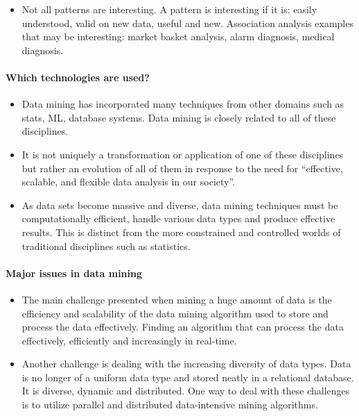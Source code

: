 \documentclass[11pt]{article}
\providecommand{\tightlist}{%
      \setlength{\itemsep}{0pt}\setlength{\parskip}{0pt}}
\begin{document}
    \begin{itemize}
\tightlist
\item
  Not all patterns are interesting. A pattern is interesting if it is:
  easily understood, valid on new data, useful and new. Association
  analysis examples that may be interesting: market basket analysis,
  alarm diagnosis, medical diagnosis.
\end{itemize}

    \paragraph{Which technologies are
used?}\label{which-technologies-are-used}

    \begin{itemize}
\tightlist
\item
  Data mining has incorporated many techniques from other domains such
  as stats, ML, database systems. Data mining is closely related to all
  of these disciplines.
\item
  It is not uniquely a transformation or application of one of these
  disciplines but rather an evolution of all of them in response to the
  need for ``effective, scalable, and flexible data analysis in our
  society''.
\item
  As data sets become massive and diverse, data mining techniques must
  be computationally efficient, handle various data types and produce
  effective results. This is distinct from the more constrained and
  controlled worlds of traditional disciplines such as statistics.
\end{itemize}

    \paragraph{Major issues in data
mining}\label{major-issues-in-data-mining}

    \begin{itemize}
\tightlist
\item
  The main challenge presented when mining a huge amount of data is the
  efficiency and scalability of the data mining algorithm used to store
  and process the data effectively. Finding an algorithm that can
  process the data effectively, efficiently and increasingly in
  real-time.
\item
  Another challenge is dealing with the increasing diversity of data
  types. Data is no longer of a uniform data type and stored neatly in a
  relational database. It is diverse, dynamic and distributed. One way
  to deal with these challenges is to utilize parallel and distributed
  data-intensive mining algorithms.
\end{itemize}
\end{document}
